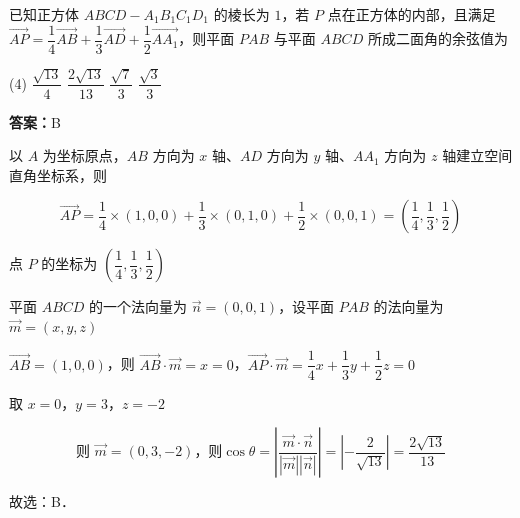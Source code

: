\vspace{2em}


\begin{example}[\bkstar{3}{5}]
已知正方体 $ABCD-A_1B_1C_1D_1$ 的棱长为 $1$，若 $P$ 点在正方体的内部，且满足 $\overrightarrow{AP}=\dfrac{1}{4}\overrightarrow{AB}+\dfrac{1}{3}\overrightarrow{AD}+\dfrac{1}{2}\overrightarrow{AA_1}$，则平面 $PAB$ 与平面 $ABCD$ 所成二面角的余弦值为
\begin{tasks}(4)
    \task $\dfrac{\sqrt{13}}{4}$
    \task $\dfrac{2\sqrt{13}}{13}$
    \task $\dfrac{\sqrt{7}}{3}$
    \task $\dfrac{\sqrt{3}}{3}$
\end{tasks}
\end{example}
\begin{solution}
\textbf{答案：}B

以 $A$ 为坐标原点，$AB$ 方向为 $x$ 轴、$AD$ 方向为 $y$ 轴、$AA_1$ 方向为 $z$ 轴建立空间直角坐标系，则

$$
\overrightarrow{AP}=\dfrac{1}{4}\times(1,0,0)+\dfrac{1}{3}\times(0,1,0)+\dfrac{1}{2}\times(0,0,1)=\left(\dfrac{1}{4},\dfrac{1}{3},\dfrac{1}{2}\right)
$$

点 $P$ 的坐标为 $\left(\dfrac{1}{4},\dfrac{1}{3},\dfrac{1}{2}\right)$

平面 $ABCD$ 的一个法向量为 $\overrightarrow{n}=(0,0,1)$，设平面 $PAB$ 的法向量为 $\overrightarrow{m}=(x,y,z)$

$\overrightarrow{AB}=(1,0,0)$，则 $\overrightarrow{AB}\cdot\overrightarrow{m}=x=0$，$\overrightarrow{AP}\cdot\overrightarrow{m}=\dfrac{1}{4}x+\dfrac{1}{3}y+\dfrac{1}{2}z=0$

取 $x=0$，$y=3$，$z=-2$

$$
\text{则 }\overrightarrow{m}=(0,3,-2)\text{，则}\cos\theta=\left|\dfrac{\overrightarrow{m}\cdot\overrightarrow{n}}{\left|\overrightarrow{m}\right|\left|\overrightarrow{n}\right|}\right|=\left|-\dfrac{2}{\sqrt{13}}\right|=\dfrac{2\sqrt{13}}{13}
$$

故选：B．
\end{solution}

\vspace{2em}

